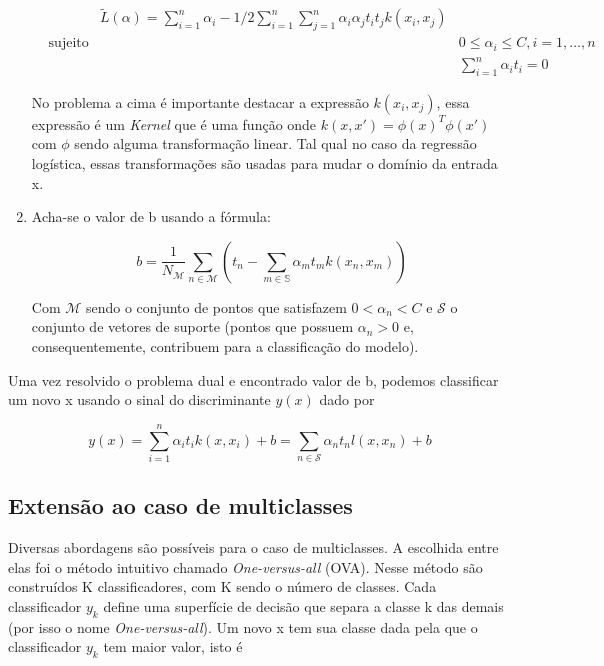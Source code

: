 \begin{enumerate}
\begin{center}
\begin{equation}
\begin{aligned}
				& & \tilde{L}(\alpha) = \sum_{i = 1}^n \alpha_i - 1/2 \sum_{i = 1}^n \sum_{j = 1}^n \alpha_i\alpha_j t_i t_j k(x_i, x_j) \\
				& \text{sujeito a}
				& & 0 \le \alpha_i \le C, i = 1, \ldots, n \\
				&&& \sum_{i = 1}^n \alpha_i t_i = 0 
				\end{aligned}
			\end{equation}
		\end{center}
	No problema a cima é importante destacar a expressão $k(x_i, x_j)$, essa expressão é um
	\textit{Kernel} que é uma função onde $k(x, x') = \phi(x)^T\phi(x')$ com $\phi$ sendo
	alguma transformação linear. Tal qual no caso da regressão logística, essas
	transformações são usadas para mudar o domínio da entrada x.
	\item Acha-se o valor de b usando a fórmula:
		\begin{center}
			\begin{equation}
				b = \frac{1}{N_{\mathcal{M}}} \sum_{n \in \mathcal{M}} \left( t_n - \sum_{m \in \mathbb{S}} \alpha_m t_m k(x_n, x_m) \right)
			\end{equation}
		\end{center}
	Com $\mathcal{M}$ sendo o conjunto de pontos que satisfazem $0 < \alpha_n < C$ e 
	$\mathcal{S}$ o conjunto de vetores de suporte (pontos que possuem $\alpha_n > 0$ e,
	consequentemente, contribuem para a classificação do modelo).
\end{enumerate}

Uma vez resolvido o problema dual e encontrado valor de b, podemos classificar um novo
x usando o sinal do discriminante $y(x)$ dado por
\begin{center}
	\begin{equation}
		y(x) = \sum_{i = 1}^n \alpha_i t_i k(x, x_i) + b = \sum_{n \in \mathcal{S}} \alpha_n t_n l(x, x_n) + b
	\end{equation}
\end{center}

\subsection{Extensão ao caso de multiclasses}

Diversas abordagens são possíveis para o caso de multiclasses. A escolhida entre elas
foi o método intuitivo chamado \textit{One-versus-all} (OVA). Nesse método são construídos
K classificadores, com K sendo o número de classes. Cada classificador $y_k$ define uma
superfície de decisão que separa a classe k das demais (por isso o nome \textit{One-versus-all}).
Um novo x tem sua classe dada pela que o classificador $y_k$ tem maior valor, isto é

